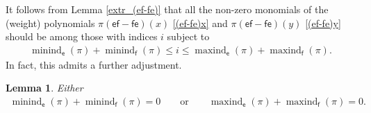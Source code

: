\documentclass[10pt,a4paper]{amsart}
\numberwithin{equation}{section}
\newtheorem{Lemma}[Theorem]{Lemma}
\begin{document}
It follows from Lemma \ref{extr_(ef-fe)} that all the non-zero monomials of the (weight) polynomials $\pi(\mathsf{ef}-\mathsf{fe})(x)$ \eqref{(ef-fe)x} and $\pi(\mathsf{ef}-\mathsf{fe})(y)$ \eqref{(ef-fe)y} should be among those with indices $i$ subject to
\begin{gather*}
\operatorname{minind}_\mathsf{e}(\pi)+
\operatorname{minind}_\mathsf{f}(\pi)\le i\le\operatorname{maxind}_\mathsf{e}(\pi)+
\operatorname{maxind}_\mathsf{f}(\pi).
\end{gather*}
In fact, this admits a further adjustment.

\begin{Lemma}\label{0ep}
Either
\begin{gather*}
\operatorname{minind}_\mathsf{e}(\pi)+\operatorname{minind}_\mathsf{f}(\pi)=0
\qquad \text{or} \qquad \operatorname{maxind}_\mathsf{e}(\pi)+\operatorname{maxind}_\mathsf{f}(\pi)=0.
\end{gather*}
\end{Lemma}
\end{document}
